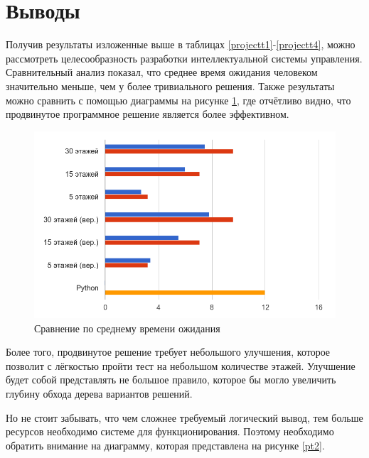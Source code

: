 \section{Выводы}

	Получив результаты изложенные выше в таблицах \ref{projectt1}-\ref{projectt4}, можно рассмотреть целесообразность
		разработки интеллектуальной системы управления. Сравнительный анализ показал, что среднее время ожидания
		человеком значительно меньше, чем у более тривиального решения. Также результаты можно сравнить с помощью
		диаграммы на рисунке \ref{pt1}, где отчётливо видно, что продвинутое программное решение является более эффективном.

	\begin{figure}[h]
		\centering
		\includegraphics[width=180mm]{src/pictures/projectp1.png}
		\caption{Сравнение по среднему времени ожидания}\label{pt1}
	\end{figure}

	Более того, продвинутое решение требует небольшого улучшения, которое позволит с лёгкостью пройти тест на
		небольшом количестве этажей. Улучшение будет собой представлять не большое правило, которое бы могло увеличить
		глубину обхода дерева вариантов решений.
		
	Но не стоит забывать, что чем сложнее требуемый логический вывод, тем больше ресурсов необходимо системе для
		функционирования. Поэтому необходимо обратить внимание на диаграмму, которая представлена на рисунке \ref{pt2}.

